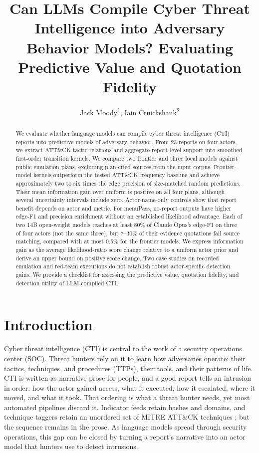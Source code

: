 \documentclass[letterpaper]{article} %
\title{Can LLMs Compile Cyber Threat Intelligence into Adversary Behavior Models? Evaluating Predictive Value and Quotation Fidelity}
\author{
    Jack Moody\textsuperscript{\rm 1},
    Iain Cruickshank\textsuperscript{\rm 2}
}
\newif\ifflags
\newcommand{\flag}[1]{\ifflags\textcolor{red}{\textsuperscript{\textbf{[#1]}}}\fi}
\begin{document}
\maketitle

\begin{abstract}
We evaluate whether language models can compile cyber threat intelligence (CTI) reports into predictive models of adversary behavior. From 23 reports on four actors, we extract ATT\&CK tactic relations and aggregate report-level support into smoothed first-order transition kernels. We compare two frontier and three local models against public emulation plans, excluding plan-cited sources from the input corpus. Frontier-model kernels outperform the tested ATT\&CK frequency baseline and achieve approximately two to six times the edge precision of size-matched random predictions. Their mean information gain over uniform is positive on all four plans, although several uncertainty intervals include zero. Actor-name-only controls show that report benefit depends on actor and metric. For menuPass, no-report outputs have higher edge-F1 and precision enrichment without an established likelihood advantage. Each of two 14B open-weight models reaches at least 80\% of Claude Opus's edge-F1 on three of four actors (not the same three), but 7--30\% of their evidence quotations fail source matching, compared with at most 0.5\% for the frontier models. We express information gain as the average likelihood-ratio score change relative to a uniform actor prior and derive an upper bound on positive score change. Two case studies on recorded emulation and red-team executions do not establish robust actor-specific detection gains. We provide a checklist for assessing the predictive value, quotation fidelity, and detection utility of LLM-compiled CTI.
\end{abstract}

\section{Introduction}

Cyber threat intelligence (CTI) is central to the work of a security operations center (SOC). Threat hunters rely on it to learn how adversaries operate: their tactics, techniques, and procedures (TTPs), their tools, and their patterns of life. CTI is written as narrative prose for people, and a good report tells an intrusion in order: how the actor gained access, what it executed, how it escalated, where it moved, and what it took. That ordering is what a threat hunter needs, yet most automated pipelines discard it.\flag{F2} Indicator feeds retain hashes and domains, and technique taggers retain an unordered set of MITRE ATT\&CK techniques \citep{strom2018attack}; but the sequence remains in the prose. As language models spread through security operations, this gap can be closed by turning a report's narrative into an actor model that hunters use to detect intrusions.
\end{document}
